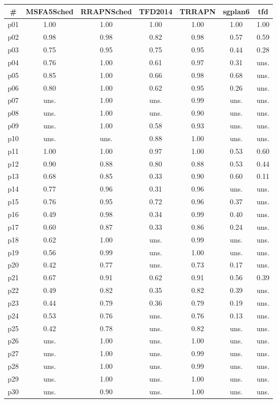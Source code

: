 \begin{tabular}{ccccccc}
\toprule
\textbf{\#} & \textbf{MSFA5Sched} & \textbf{RRAPNSched} & \textbf{TFD2014} & \textbf{TRRAPN} & \textbf{sgplan6} & \textbf{tfd}\\
\midrule
p01 & 1.00 & 1.00 & 1.00 & 1.00 & 1.00 & 1.00\\
p02 & 0.98 & 0.98 & 0.82 & 0.98 & 0.57 & 0.59\\
p03 & 0.75 & 0.95 & 0.75 & 0.95 & 0.44 & 0.28\\
p04 & 0.76 & 1.00 & 0.61 & 0.97 & 0.31 & uns.\\
p05 & 0.85 & 1.00 & 0.66 & 0.98 & 0.68 & uns.\\
p06 & 0.80 & 1.00 & 0.62 & 0.95 & 0.26 & uns.\\
p07 & uns. & 1.00 & uns. & 0.99 & uns. & uns.\\
p08 & uns. & 1.00 & uns. & 0.90 & uns. & uns.\\
p09 & uns. & 1.00 & 0.58 & 0.93 & uns. & uns.\\
p10 & uns. & uns. & 0.88 & 1.00 & uns. & uns.\\
p11 & 1.00 & 1.00 & 0.97 & 1.00 & 0.53 & 0.60\\
p12 & 0.90 & 0.88 & 0.80 & 0.88 & 0.53 & 0.44\\
p13 & 0.68 & 0.85 & 0.33 & 0.90 & 0.60 & 0.11\\
p14 & 0.77 & 0.96 & 0.31 & 0.96 & uns. & uns.\\
p15 & 0.76 & 0.95 & 0.72 & 0.96 & 0.37 & uns.\\
p16 & 0.49 & 0.98 & 0.34 & 0.99 & 0.40 & uns.\\
p17 & 0.60 & 0.87 & 0.33 & 0.86 & 0.24 & uns.\\
p18 & 0.62 & 1.00 & uns. & 0.99 & uns. & uns.\\
p19 & 0.56 & 0.99 & uns. & 1.00 & uns. & uns.\\
p20 & 0.42 & 0.77 & uns. & 0.73 & 0.17 & uns.\\
p21 & 0.67 & 0.91 & 0.62 & 0.91 & 0.56 & 0.39\\
p22 & 0.49 & 0.82 & 0.35 & 0.82 & 0.39 & uns.\\
p23 & 0.44 & 0.79 & 0.36 & 0.79 & 0.19 & uns.\\
p24 & 0.53 & 0.76 & uns. & 0.76 & 0.13 & uns.\\
p25 & 0.42 & 0.78 & uns. & 0.82 & uns. & uns.\\
p26 & uns. & 1.00 & uns. & 1.00 & uns. & uns.\\
p27 & uns. & 1.00 & uns. & 0.99 & uns. & uns.\\
p28 & uns. & 1.00 & uns. & 0.99 & uns. & uns.\\
p29 & uns. & 1.00 & uns. & 1.00 & uns. & uns.\\
p30 & uns. & 0.90 & uns. & 1.00 & uns. & uns.\\
\bottomrule
\end{tabular}

